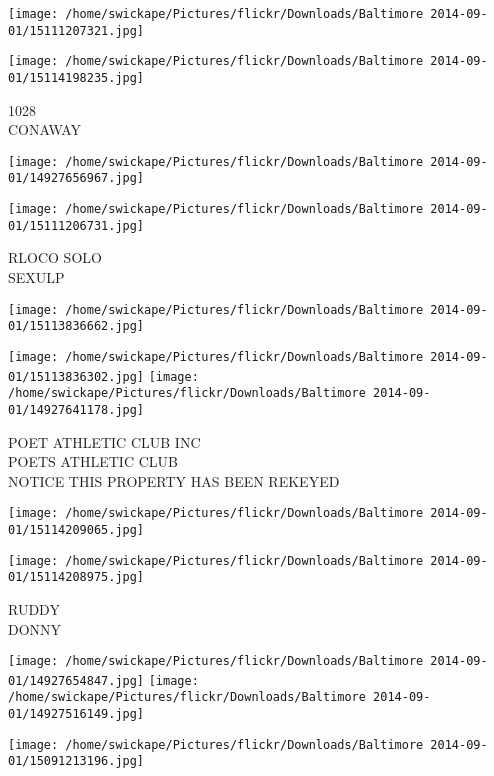 \documentclass[10pt,letterpaper]{article}
\begin{document}
\texttt{[image: /home/swickape/Pictures/flickr/Downloads/Baltimore 2014-09-01/15111207321.jpg]}

\vspace{0.25in}
\texttt{[image: /home/swickape/Pictures/flickr/Downloads/Baltimore 2014-09-01/15114198235.jpg]}

1028\\
CONAWAY\\
\pagebreak

\texttt{[image: /home/swickape/Pictures/flickr/Downloads/Baltimore 2014-09-01/14927656967.jpg]}

\vspace{0.25in}
\texttt{[image: /home/swickape/Pictures/flickr/Downloads/Baltimore 2014-09-01/15111206731.jpg]}

RLOCO SOLO\\
SEXULP\\
\pagebreak

\texttt{[image: /home/swickape/Pictures/flickr/Downloads/Baltimore 2014-09-01/15113836662.jpg]}

\vspace{0.25in}
\texttt{[image: /home/swickape/Pictures/flickr/Downloads/Baltimore 2014-09-01/15113836302.jpg]}
\texttt{[image: /home/swickape/Pictures/flickr/Downloads/Baltimore 2014-09-01/14927641178.jpg]}

POET ATHLETIC CLUB INC\\
POETS ATHLETIC CLUB\\
NOTICE THIS PROPERTY HAS BEEN REKEYED\\
\pagebreak

\texttt{[image: /home/swickape/Pictures/flickr/Downloads/Baltimore 2014-09-01/15114209065.jpg]}

\vspace{0.25in}
\texttt{[image: /home/swickape/Pictures/flickr/Downloads/Baltimore 2014-09-01/15114208975.jpg]}

RUDDY\\
DONNY\\
\pagebreak

\texttt{[image: /home/swickape/Pictures/flickr/Downloads/Baltimore 2014-09-01/14927654847.jpg]}
\texttt{[image: /home/swickape/Pictures/flickr/Downloads/Baltimore 2014-09-01/14927516149.jpg]}

\texttt{[image: /home/swickape/Pictures/flickr/Downloads/Baltimore 2014-09-01/15091213196.jpg]}
\end{document}
